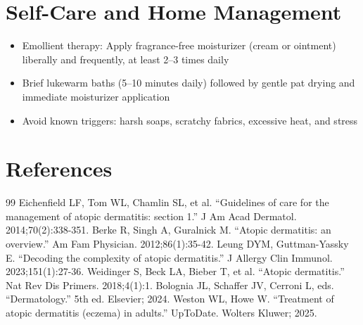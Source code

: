 \section*{Self-Care and Home Management}
\begin{itemize}
  \item Emollient therapy: Apply fragrance-free moisturizer (cream or ointment) liberally and frequently, at least 2--3 times daily
  \item Brief lukewarm baths (5--10 minutes daily) followed by gentle pat drying and immediate moisturizer application
  \item Avoid known triggers: harsh soaps, scratchy fabrics, excessive heat, and stress
\end{itemize}

\section*{References}
\begin{thebibliography}{99}
 Eichenfield LF, Tom WL, Chamlin SL, et al. ``Guidelines of care for the management of atopic dermatitis: section 1.'' J Am Acad Dermatol. 2014;70(2):338-351.
 Berke R, Singh A, Guralnick M. ``Atopic dermatitis: an overview.'' Am Fam Physician. 2012;86(1):35-42.
 Leung DYM, Guttman-Yassky E. ``Decoding the complexity of atopic dermatitis.'' J Allergy Clin Immunol. 2023;151(1):27-36.
 Weidinger S, Beck LA, Bieber T, et al. ``Atopic dermatitis.'' Nat Rev Dis Primers. 2018;4(1):1.
 Bolognia JL, Schaffer JV, Cerroni L, eds. ``Dermatology.'' 5th ed. Elsevier; 2024.
 Weston WL, Howe W. ``Treatment of atopic dermatitis (eczema) in adults.'' UpToDate. Wolters Kluwer; 2025.
\end{thebibliography}
